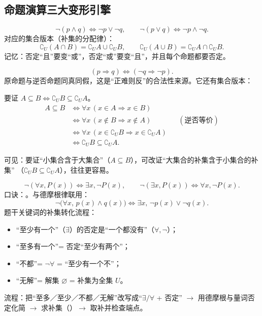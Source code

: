\begin{explore}
\subsection{命题演算三大变形引擎}

\[
  \neg(p\land q)\iff\neg p\lor\neg q,\qquad
  \neg(p\lor q)\iff\neg p\land\neg q.
\]
对应的集合版本（补集的分配律）：
\[
  \complement_U(A\cap B)=\complement_U A\cup\complement_U B,\qquad
  \complement_U(A\cup B)=\complement_U A\cap\complement_U B.
\]
记忆：否定“且”要变“或”，否定“或”要变“且”，并且每个命题都要否定。

\[
  (p\Rightarrow q)\iff(\neg q\Rightarrow\neg p).
\]
原命题与逆否命题同真同假，这是“正难则反”的合法性来源。它还有集合版本：

\begin{derivation}
要证 $A\subseteq B\iff\complement_U B\subseteq\complement_U A$。
\begin{align*}
  A\subseteq B &\iff \forall x\,(x\in A\Rightarrow x\in B)\\
  &\iff \forall x\,(x\notin B\Rightarrow x\notin A) &&(\text{逆否等价})\\
  &\iff \forall x\,(x\in\complement_U B\Rightarrow x\in\complement_U A)\\
  &\iff \complement_U B\subseteq\complement_U A.
\end{align*}
\end{derivation}

可见：要证“小集合含于大集合”（$A\subseteq B$），可改证“大集合的补集含于小集合的补集”
（$\complement_U B\subseteq\complement_U A$），往往更容易。

\[
  \neg(\forall x,P(x))\iff\exists x,\neg P(x),\qquad
  \neg(\exists x,P(x))\iff\forall x,\neg P(x).
\]
口诀：。与德摩根律联用：
\[
  \neg\bigl(\forall x,\,p(x)\land q(x)\bigr)\iff\exists x,\,\neg p(x)\lor\neg q(x).
\]
题干关键词的补集转化流程：
\begin{itemize}
  \item “至少有一个”（$\exists$）的否定是“一个都没有”（$\forall,\neg$）；
  \item “至多有一个”= 否定“至少有两个”；
  \item “不都”= $\neg\forall$ = “至少有一个不”；
  \item “无解”= 解集 $\varnothing$ = 补集为全集 $U$。
\end{itemize}
流程：把“至多／至少／不都／无解”改写成“$\exists/\forall$ + 否定” $\to$ 用德摩根与量词否定化简
$\to$ 求补集（）$\to$ 取补并检查端点。


\end{explore}
